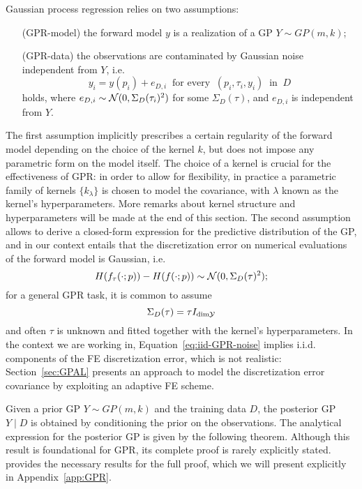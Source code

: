 Gaussian process regression relies on two assumptions:
\begin{itemize}[font=\itshape, leftmargin=1.5cm, align=right, labelwidth=2.4cm]
    \item[(GPR-model)] the forward model $y$ is a realization of a GP $Y \sim GP(m, k)$;
    \item[(GPR-data)]the observations are contaminated by Gaussian noise independent from $Y$, i.e. 
    \[ 
        y_i = y(p_i) + e_{D,i} \ \text{ for every } \ (p_i,\tau_i,y_i) \ \text{ in } \ D 
    \] 
    holds, where $e_{D,i} \sim \mathcal N(0, \Sigma_D(\tau_i)^2)$ for some $\Sigma_D(\tau)$, and $e_{D,i}$ is independent from $Y$.
\end{itemize}  
The first assumption implicitly prescribes a certain regularity of the forward model depending on the choice of the kernel $k$, but does not impose any parametric form on the model itself. 
The choice of a kernel is crucial for the effectiveness of GPR: in order to allow for flexibility, in practice a parametric family of kernels $\{ k_\lambda\}$ is chosen to model the covariance, with $\lambda$ known as the kernel's hyperparameters. More remarks about kernel structure and hyperparameters will be made at the end of this section. \newline
The second assumption allows to derive a closed-form expression for the predictive distribution of the GP, and in our context entails that the discretization error on numerical evaluations of the forward model is Gaussian, i.e. \[
    H(f_{\tau}(\cdot; p)) - H(f(\cdot; p)) \sim \mathcal N(0, \Sigma_D(\tau)^2);
\] for a general GPR task, it is common to assume 
\begin{equation}\label{eq:iid-GPR-noise}
    \Sigma_D(\tau) = \tau I_{\text{dim} \mathcal Y}
\end{equation} 
and often $\tau$ is unknown and fitted together with the kernel's hyperparameters. \newline
In the context we are working in, Equation~\eqref{eq:iid-GPR-noise} implies i.i.d. components of the FE discretization error, which is not realistic: Section~\ref{sec:GPAL} presents an approach to model the discretization error covariance by exploiting an adaptive FE scheme. \newline

Given a prior GP $Y \sim GP(m, k)$ and the training data $D$, the posterior GP $Y \mid D$ is obtained by conditioning the prior on the observations. 
The analytical expression for the posterior GP is given by the following theorem.
Although this result is foundational for GPR, its complete proof is rarely explicitly stated.~\cite[Appendix A]{RasmussenWilliams2006} provides the necessary results for the full proof, which we will present explicitly in Appendix~\ref{app:GPR}.

